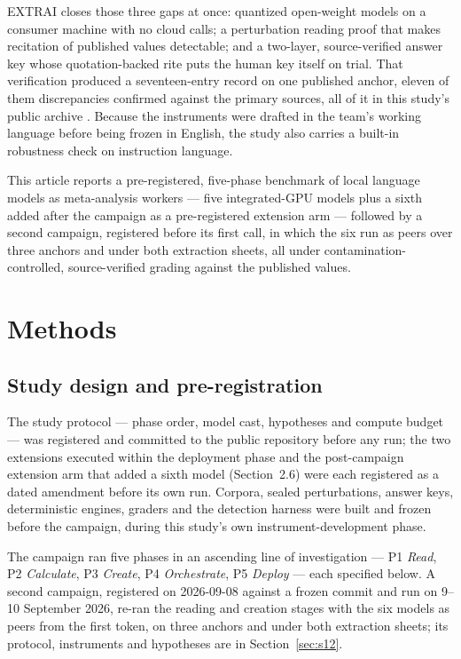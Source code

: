 \documentclass[11pt]{article}
\begin{document}
EXTRAI closes those three gaps at once: quantized open-weight models on a consumer machine with no cloud calls; a perturbation reading proof that makes recitation of published values detectable; and a two-layer, source-verified answer key whose quotation-backed rite puts the human key itself on trial. That verification produced a seventeen-entry record on one published anchor, eleven of them discrepancies confirmed against the primary sources, all of it in this study's public archive \citep{barra2026extrai}. Because the instruments were drafted in the team's working language before being frozen in English, the study also carries a built-in robustness check on instruction language.

This article reports a pre-registered, five-phase benchmark of local language models as meta-analysis workers --- five integrated-GPU models plus a sixth added after the campaign as a pre-registered extension arm --- followed by a second campaign, registered before its first call, in which the six run as peers over three anchors and under both extraction sheets, all under contamination-controlled, source-verified grading against the published values.

\section{Methods}

\subsection{Study design and pre-registration}
The study protocol --- phase order, model cast, hypotheses and compute budget --- was registered and committed to the public repository before any run; the two extensions executed within the deployment phase and the post-campaign extension arm that added a sixth model (Section~2.6) were each registered as a dated amendment before its own run. Corpora, sealed perturbations, answer keys, deterministic engines, graders and the detection harness were built and frozen before the campaign, during this study's own instrument-development phase.

The campaign ran five phases in an ascending line of investigation --- P1 \emph{Read}, P2 \emph{Calculate}, P3 \emph{Create}, P4 \emph{Orchestrate}, P5 \emph{Deploy} --- each specified below. A second campaign, registered on 2026-09-08 against a frozen commit and run on 9--10 September 2026, re-ran the reading and creation stages with the six models as peers from the first token, on three anchors and under both extraction sheets; its protocol, instruments and hypotheses are in Section~\ref{sec:s12}.
\end{document}
